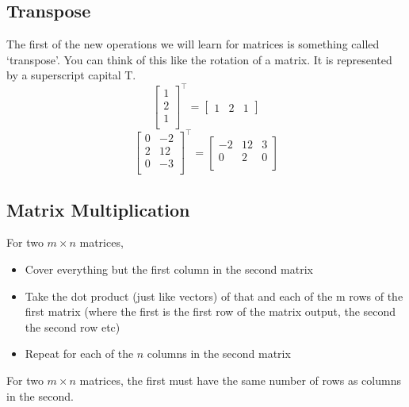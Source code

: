 \documentclass[12pt] {article}
\begin{document}
\subsection*{Transpose}
The first of the new operations we will learn for matrices is something called `transpose'.
You can think of this like the rotation of a matrix. It is represented by a superscript capital T.
\begin{equation*}
  \begin{bmatrix} 
    1 \\
    2 \\
    1 \\
  \end{bmatrix} 
  ^\intercal
  =
  \begin{bmatrix}
    1 & 2 & 1 
  \end{bmatrix}
\end{equation*}
\begin{equation*}
  \begin{bmatrix} 
    0 & -2 \\
    2 & 12 \\
    0 & -3 \\
  \end{bmatrix} 
  ^\intercal
  =
  \begin{bmatrix} 
    -2 & 12 & 3 \\
     0 & 2 & 0 \\
  \end{bmatrix} 
\end{equation*}
\newpage

\subsection*{Matrix Multiplication}
For two $m \times n$ matrices, 
\begin{itemize}
  \item Cover everything but the first column in the second matrix
  \item Take the dot product (just like vectors) of that and each of the m rows of the first matrix (where the first is the first row of the matrix output, the second the second row etc)
  \item Repeat for each of the $n$ columns in the second matrix
\end{itemize}
For two $m \times n$ matrices, the first must have the same number of rows as columns in the
second. 
\end{document}

